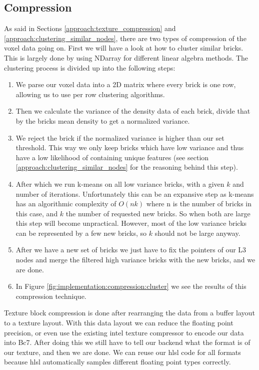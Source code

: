 \subsection{Compression} \label{implementation:compression}
As said in Sections \ref{approach:texture_compression} and \ref{approach:clustering_similar_nodes}, there are two types of compression of the voxel data going on. First we will have a look at how to cluster similar bricks. This is largely done by using NDarray \cite{NDarray} for different linear algebra methods. The clustering process is divided up into the following steps:

\begin{enumerate}
    \itemsep0em 
    \item We parse our voxel data into a 2D matrix where every brick is one row, allowing us to use per row clustering algorithms.
    \item Then we calculate the variance of the density data of each brick, divide that by the bricks mean density to get a normalized variance.
    \item We reject the brick if the normalized variance is higher than our set threshold. This way we only keep bricks which have low variance and thus have a low likelihood of containing unique features (see section \ref{approach:clustering_similar_nodes} for the reasoning behind this step).
    \item After which we run k-means on all low variance bricks, with a given $k$ and number of iterations. Unfortunately this can be an expansive step as k-means has an algorithmic complexity of $O(nk)$ where n is the number of bricks in this case, and $k$ the number of requested new bricks. So when both are large this step will become unpractical. However, most of the low variance bricks can be represented by a few new bricks, so $k$ should not be large anyway.
    \item After we have a new set of bricks we just have to fix the pointers of our L3 nodes and merge the filtered high variance bricks with the new bricks, and we are done.
    \item In Figure \ref{fig:implementation:compression:cluster} we see the results of this compression technique.
\end{enumerate}


\noindent Texture block compression is done after rearranging the data from a buffer layout to a texture layout. With this data layout we can reduce the floating point precision, or even use the existing intel texture compressor \cite{ISPCTextureCompressor} to encode our data into Bc7. After doing this we still have to tell our backend what the format is of our texture, and then we are done. We can reuse our hlsl code for all formats because hlsl automatically samples different floating point types correctly.




